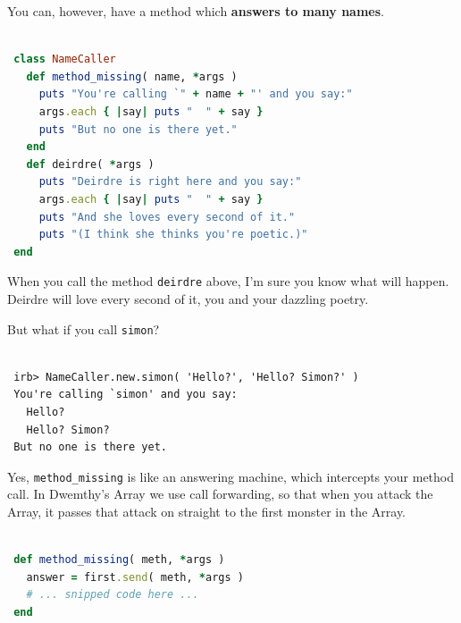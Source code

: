 \documentclass[10pt,twoside]{report}
\begin{document}
You can, however, have a method which {\bf answers to many names}.


\begin{lstlisting}[basicstyle=\ttfamily\color{basiccolor},
    commentstyle = \ttfamily\color{commentcolor},
    keywordstyle=\ttfamily\color{keywordscolor},
    stringstyle=\color{stringcolor},
    language=Ruby,
    basicstyle=\small\ttfamily,
    showstringspaces=false,
  ]

 class NameCaller
   def method_missing( name, *args )
     puts "You're calling `" + name + "' and you say:"
     args.each { |say| puts "  " + say }
     puts "But no one is there yet."
   end
   def deirdre( *args )
     puts "Deirdre is right here and you say:"
     args.each { |say| puts "  " + say }
     puts "And she loves every second of it."
     puts "(I think she thinks you're poetic.)"
 end

\end{lstlisting}


When you call the method \lstinline[breaklines=true]|deirdre| above,
I'm sure you know what will happen.  Deirdre will love every second of
it, you and your dazzling poetry.

But what if you call \lstinline[breaklines=true]|simon|?


\begin{lstlisting}

 irb> NameCaller.new.simon( 'Hello?', 'Hello? Simon?' )
 You're calling `simon' and you say:
   Hello?
   Hello? Simon?
 But no one is there yet.

\end{lstlisting}


Yes, \lstinline[breaklines=true]|method_missing| is like an answering
machine, which intercepts your method call.  In Dwemthy's Array we use
call forwarding, so that when you attack the Array, it passes that
attack on straight to the first monster in the Array.


\begin{lstlisting}[basicstyle=\ttfamily\color{basiccolor},
    commentstyle = \ttfamily\color{commentcolor},
    keywordstyle=\ttfamily\color{keywordscolor},
    stringstyle=\color{stringcolor},
    language=Ruby,
    basicstyle=\small\ttfamily,
    showstringspaces=false,
  ]

 def method_missing( meth, *args )
   answer = first.send( meth, *args )
   # ... snipped code here ...
 end

\end{lstlisting}
\end{document}
